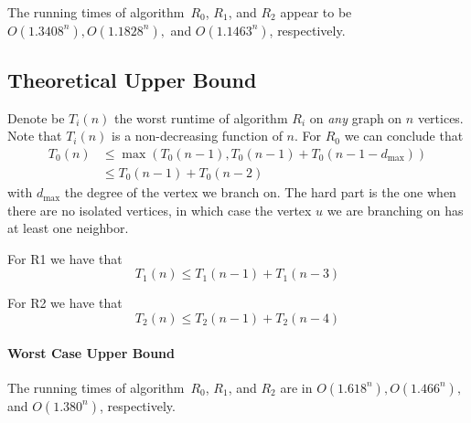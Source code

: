 \documentclass{tufte-handout}
\begin{document}
\medskip

\noindent
{}
The running times of algorithm~$R_0$, $R_1$, and $R_2$ appear to be
$O(1.3408^n), O(1.1828^n),$ and $O(1.1463^n)$, respectively.

\subsection{Theoretical Upper Bound}

Denote be $T_i(n)$ the worst runtime of algorithm $R_i$ on \emph{any} graph on $n$ vertices.
Note that $T_i(n)$ is a non-decreasing function of $n$.
For $R_0$ we can conclude that
\begin{align*}
T_0(n) &\leq\max(T_0(n-1), T_0(n-1)+T_0(n-1-d_{\mbox{max}})) \\ &\leq T_0(n-1)+T_0(n-2)
\end{align*}
with $d_{\mbox{max}}$ the degree of the vertex we branch on. The hard part is the one when there are no isolated vertices, in which case the vertex $u$ we are branching on has at least one neighbor. 

For R1 we have that
 \[
 T_1(n) \leq T_1(n-1)+T_1(n-3)
 \]

For R2 we have that
 \[
 T_2(n) \leq T_2(n-1)+T_2(n-4)
 \]
\paragraph{Worst Case Upper Bound}
The running times of algorithm~$R_0$, $R_1$, and $R_2$ are in
$O(1.618^n),O(1.466^n),$ and $O(1.380^n)$, respectively.
    
\end{document}
